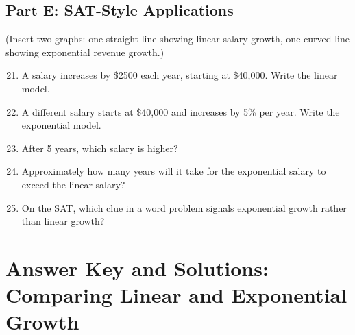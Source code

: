 \documentclass[12pt]{article}
\begin{document}
\subsection*{Part E: SAT-Style Applications}
(Insert two graphs: one straight line showing linear salary growth, one curved line showing exponential revenue growth.)

\begin{enumerate}
  \setcounter{enumi}{20}
  \item A salary increases by \$2500 each year, starting at \$40,000. Write the linear model.
  \item A different salary starts at \$40,000 and increases by 5\% per year. Write the exponential model.
  \item After 5 years, which salary is higher?
  \item Approximately how many years will it take for the exponential salary to exceed the linear salary?
  \item On the SAT, which clue in a word problem signals exponential growth rather than linear growth?
\end{enumerate}

\newpage


\section*{Answer Key and Solutions: Comparing Linear and Exponential Growth}
\end{document}
